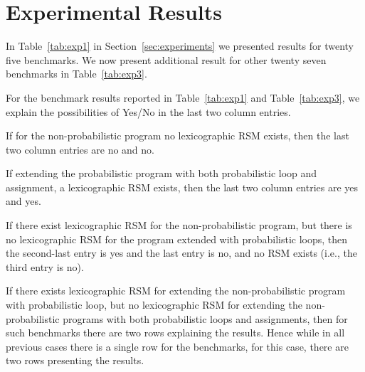 
\section{Experimental Results}\label{sec:app_ex}
In Table~\ref{tab:exp1} in Section~\ref{sec:experiments} we presented results for twenty five benchmarks.
We now present additional result for other twenty seven benchmarks in Table~\ref{tab:exp3}.

\smallskip{}
For the benchmark results reported in Table~\ref{tab:exp1} and Table~\ref{tab:exp3}, 
we explain the possibilities of Yes/No in the last two column entries.
\begin{compactitem}
\item If for the non-probabilistic program no lexicographic RSM exists, then the last two 
column entries are no and no.

\item If extending the probabilistic program with both probabilistic loop and assignment,
a lexicographic RSM exists, then the last two column entries are yes and yes. 

\item If there exist lexicographic RSM for the non-probabilistic program, but there is no
lexicographic RSM for the program extended with probabilistic loops, then the second-last 
entry is yes and the last entry is no, and no RSM exists (i.e., the third entry is no).

\item If there exists lexicographic RSM for extending the non-probabilistic program 
with probabilistic loop, but no lexicographic RSM for extending the non-probabilistic programs
with both probabilistic loops and assignments, then for such benchmarks there are two rows 
explaining the results. 
Hence while in all previous cases there is a single row for the benchmarks, for this case,
there are two rows presenting the results.
\end{compactitem}



